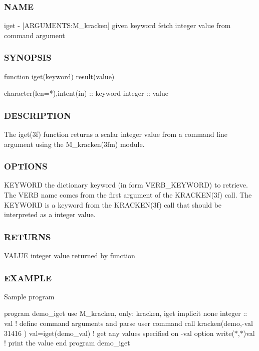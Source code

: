 \subsubsection*{N\+A\+ME}

iget -\/ \mbox{[}A\+R\+G\+U\+M\+E\+N\+TS\+:M\+\_\+kracken\mbox{]} given keyword fetch integer value from command argument 

\subsubsection*{S\+Y\+N\+O\+P\+S\+IS}

\begin{DoxyVerb}function iget(keyword) result(value)

 character(len=*),intent(in)  :: keyword
 integer              :: value
\end{DoxyVerb}


\subsubsection*{D\+E\+S\+C\+R\+I\+P\+T\+I\+ON}

The iget(3f) function returns a scalar integer value from a command line argument using the M\+\_\+kracken(3fm) module.

\subsubsection*{O\+P\+T\+I\+O\+NS}

K\+E\+Y\+W\+O\+RD the dictionary keyword (in form V\+E\+R\+B\+\_\+\+K\+E\+Y\+W\+O\+RD) to retrieve. The V\+E\+RB name comes from the first argument of the K\+R\+A\+C\+K\+E\+N(3f) call. The K\+E\+Y\+W\+O\+RD is a keyword from the K\+R\+A\+C\+K\+E\+N(3f) call that should be interpreted as a integer value.

\subsubsection*{R\+E\+T\+U\+R\+NS}

V\+A\+L\+UE integer value returned by function

\subsubsection*{E\+X\+A\+M\+P\+LE}

Sample program

program demo\+\_\+iget use M\+\_\+kracken, only\+: kracken, iget implicit none integer \+:\+: val ! define command arguments and parse user command call kracken(\textquotesingle{}demo\textquotesingle{},\textquotesingle{}-\/val 31416\textquotesingle{} ) val=iget(\textquotesingle{}demo\+\_\+val\textquotesingle{}) ! get any values specified on -\/val option write($\ast$,$\ast$)val ! print the value end program demo\+\_\+iget


